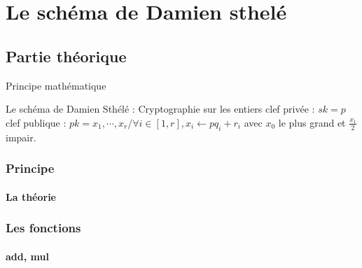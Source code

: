 \section{Le schéma de Damien sthelé}


\subsection{Partie théorique}

\begin{frame}{Principe mathématique}
	\begin{block}{Le schéma de Damien Sthélé : Cryptographie sur les entiers}
		clef privée : $ sk = p $ 
		clef publique : $ pk = x_1, \cdots , x_r / \forall i \in [ 1,r ], x_i \leftarrow p q_i + r_i $
		avec $ x_0 $ le plus grand et $ \frac{x_1}{2} $ impair. %
	\end{block}

\end{frame}

\begin{frame}
\frametitle{Principe}
\framesubtitle{La théorie}
\end{frame}


\begin{frame}
\frametitle{Les fonctions}
\framesubtitle{add, mul}
\end{frame}